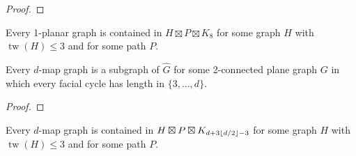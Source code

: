 \documentclass{patmorin}
\DeclareMathOperator{\tw}{tw}
\DeclarePairedDelimiter{\floor}{\lfloor}{\rfloor}
\renewcommand{\leq}{\leqslant}
\begin{document}
\begin{proof}
\end{proof}

\begin{cor}
	\label{New1Planar}
	Every 1-planar graph is contained in $H \boxtimes P \boxtimes K_8$ for some graph $H$ with $\tw(H) \leq 3$ and for some path $P$.
\end{cor}

\begin{lem}
Every $d$-map graph is a subgraph of $\widehat{G}$ for some 2-connected plane graph $G$ in which every facial cycle has length in $\{3,\dots,d\}$.
\end{lem}

\begin{proof}
\end{proof}

\begin{cor}
\label{NewMapGraph}
Every $d$-map graph is contained in $H \boxtimes P \boxtimes K_{ d + 3\floor{d/2} -3 }$ for some graph $H$ with $\tw(H) \leq 3$ and for some path $P$.
\end{cor}
\end{document}
